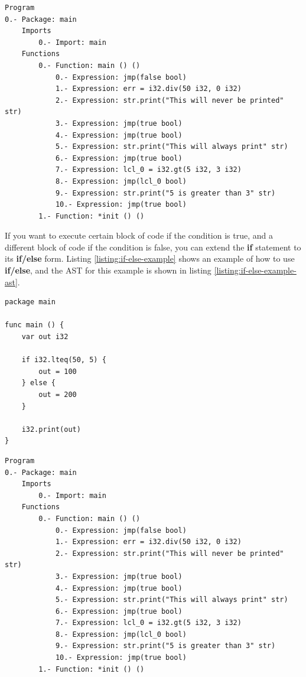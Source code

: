 \documentclass[11pt,fleqn,openany]{book} %
\begin{document}
\begin{lstlisting}[caption={Abstract syntax tree of listing \ref{listing:if-example}},captionpos=b,label={listing:if-example-ast}]
Program
0.- Package: main
	Imports
		0.- Import: main
	Functions
		0.- Function: main () ()
			0.- Expression: jmp(false bool)
			1.- Expression: err = i32.div(50 i32, 0 i32)
			2.- Expression: str.print("This will never be printed" str)
			3.- Expression: jmp(true bool)
			4.- Expression: jmp(true bool)
			5.- Expression: str.print("This will always print" str)
			6.- Expression: jmp(true bool)
			7.- Expression: lcl_0 = i32.gt(5 i32, 3 i32)
			8.- Expression: jmp(lcl_0 bool)
			9.- Expression: str.print("5 is greater than 3" str)
			10.- Expression: jmp(true bool)
		1.- Function: *init () ()
\end{lstlisting}

If you want to execute certain block of code if the condition is true, and a different block of code if the condition is false, you can extend the \textbf{if} statement to its \textbf{if/else} form. Listing \ref{listing:if-else-example} shows an example of how to use \textbf{if/else}, and the AST for this example is shown in listing \ref{listing:if-else-example-ast}.

\begin{lstlisting}[caption={Using if/else for control flow},captionpos=b,label={listing:if-else-example}]
package main

func main () {
	var out i32

	if i32.lteq(50, 5) {
		out = 100
	} else {
		out = 200
	}

	i32.print(out)
}
\end{lstlisting}

\begin{lstlisting}[caption={Abstract syntax tree of listing \ref{listing:if-else-example}},captionpos=b,label={listing:if-else-example-ast}]
Program
0.- Package: main
	Imports
		0.- Import: main
	Functions
		0.- Function: main () ()
			0.- Expression: jmp(false bool)
			1.- Expression: err = i32.div(50 i32, 0 i32)
			2.- Expression: str.print("This will never be printed" str)
			3.- Expression: jmp(true bool)
			4.- Expression: jmp(true bool)
			5.- Expression: str.print("This will always print" str)
			6.- Expression: jmp(true bool)
			7.- Expression: lcl_0 = i32.gt(5 i32, 3 i32)
			8.- Expression: jmp(lcl_0 bool)
			9.- Expression: str.print("5 is greater than 3" str)
			10.- Expression: jmp(true bool)
		1.- Function: *init () ()
\end{lstlisting}
\end{document}
